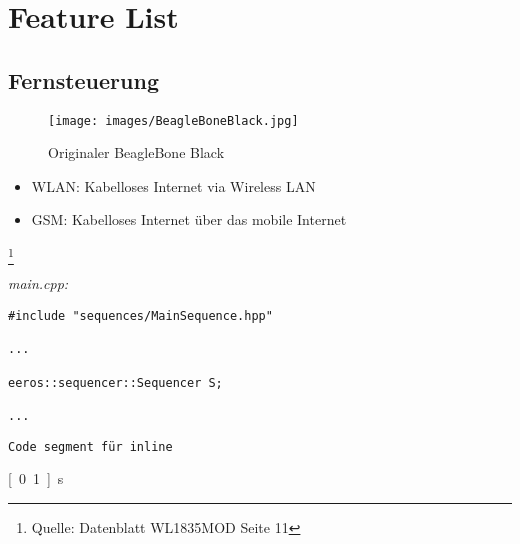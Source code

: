 


\chapter{Feature List}
\section{Fernsteuerung}


\begin{figure}[!ht]
\centering
\texttt{[image: images/BeagleBoneBlack.jpg]}
\caption{Originaler BeagleBone Black}
\label{fig:BeagleBoneBlack}
\end{figure}


\begin{itemize}
\item WLAN: Kabelloses Internet via Wireless LAN
\item GSM: Kabelloses Internet über das mobile Internet
\end{itemize}


\footnote{Quelle: Datenblatt WL1835MOD Seite 11}


\textit{main.cpp:}\
\begin{lstlisting}
#include "sequences/MainSequence.hpp"

...

eeros::sequencer::Sequencer S;

...
\end{lstlisting}


\texttt{Code segment für inline} 


\usepackage{units}
\unit[0.1]{s}
